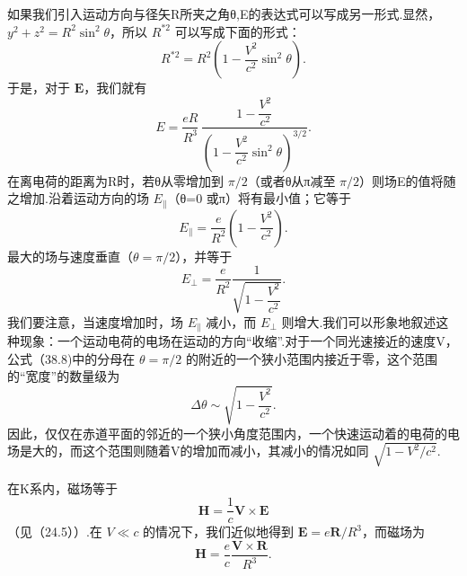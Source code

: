如果我们引入运动方向与径矢R所夹之角θ,E的表达式可以写成另一形式.显然，$y^2+z^2=R^2\sin^2\theta$，所以 $R^{*2}$ 可以写成下面的形式：
\begin{equation}
  R^{*2}=R^2\left(1-\frac{V^2}{c^2}\sin^2\theta\right).
\end{equation}
于是，对于 $\boldsymbol{E}$，我们就有
\begin{equation}
  E=\frac{eR}{R^3}\,
  \frac{1-\dfrac{V^2}{c^2}}{\left(1-\dfrac{V^2}{c^2}\sin^2\theta\right)^{3/2}}.
\end{equation}
在离电荷的距离为R时，若θ从零增加到 $\pi/2$（或者θ从π减至 $\pi/2$）则场E的值将随之增加.沿着运动方向的场 $E_{\parallel}$（θ=0 或π）将有最小值；它等于
\begin{equation*}
  E_{\parallel}=\frac{e}{R^2}\left(1-\frac{V^2}{c^2}\right).
\end{equation*}
最大的场与速度垂直（$\theta=\pi/2$），并等于
\begin{equation*}
  E_{\perp}=\frac{e}{R^2}\frac{1}{\sqrt{1-\dfrac{V^2}{c^2}}}.
\end{equation*}
我们要注意，当速度增加时，场 $E_{\parallel}$ 减小，而 $E_{\perp}$ 则增大.我们可以形象地叙述这种现象：一个运动电荷的电场在运动的方向“收缩”.对于一个同光速接近的速度V，公式（38.8)中的分母在 $\theta=\pi/2$ 的附近的一个狭小范围内接近于零，这个范围的“宽度”的数量级为
\begin{equation*}
  \Delta\theta\sim\sqrt{1-\frac{V^2}{c^2}}.
\end{equation*}
因此，仅仅在赤道平面的邻近的一个狭小角度范围内，一个快速运动着的电荷的电场是大的，而这个范围则随着V的增加而减小，其减小的情况如同 $\sqrt{1-V^2/c^2}$.

在K系内，磁场等于
\begin{equation}
  \boldsymbol{H}=\frac{1}{c}\boldsymbol{V}\times\boldsymbol{E}
\end{equation}
（见（24.5））.在 $V\ll c$ 的情况下，我们近似地得到 $\boldsymbol{E}=e\boldsymbol{R}/R^3$，而磁场为
\begin{equation}
  \boldsymbol{H}=\frac{e}{c}\frac{\boldsymbol{V}\times\boldsymbol{R}}{R^3}.
\end{equation}

